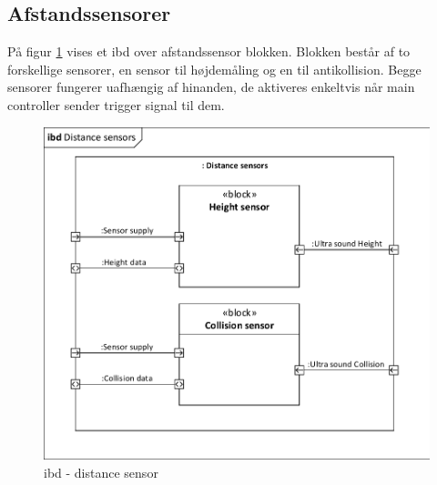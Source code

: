 \subsection{Afstandssensorer}

På figur \ref{fig:ibd_distancesensor} vises et ibd over afstandssensor blokken. 
Blokken består af to forskellige sensorer, en sensor til højdemåling og en til antikollision. Begge sensorer fungerer uafhængig af hinanden, de aktiveres enkeltvis når main controller sender trigger signal til dem.   

\begin{figure}[H]
\centering
\includegraphics[width=1\textwidth]{Billeder/IBD/ibd4_distancesensor.pdf}
\vspace{-0.5cm}
\caption{ibd - distance sensor}
\label{fig:ibd_distancesensor}
\end{figure}

